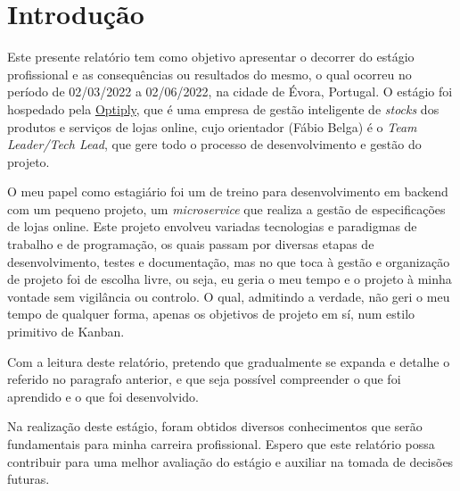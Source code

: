 \chapter{Introdução}\label{intro}

Este presente relatório tem como objetivo apresentar o decorrer do estágio profissional e as consequências ou resultados do mesmo, o qual ocorreu no período de 02/03/2022 a 02/06/2022, na cidade de Évora, Portugal. O estágio foi hospedado pela \href{https://optiply.nl/}{Optiply}, que é uma empresa de gestão inteligente de \textit{stocks} dos produtos e serviços de lojas online, cujo orientador (Fábio Belga) é o \textit{Team Leader/Tech Lead}, que gere todo o processo de desenvolvimento e gestão do projeto.

O meu papel como estagiário foi um de treino para desenvolvimento em backend com um pequeno projeto, um \textit{microservice} que realiza a gestão de especificações de lojas online. Este projeto envolveu variadas tecnologias e paradigmas de trabalho e de programação, os quais passam por diversas etapas de desenvolvimento, testes e documentação, mas no que toca à gestão e organização de projeto foi de escolha livre, ou seja, eu geria o meu tempo e o projeto à minha vontade sem vigilância ou controlo. O qual, admitindo a verdade, não geri o meu tempo de qualquer forma, apenas os objetivos de projeto em sí, num estilo primitivo de Kanban.

Com a leitura deste relatório, pretendo que gradualmente se expanda e detalhe o referido no paragrafo anterior, e que seja possível compreender o que foi aprendido e o que foi desenvolvido.

Na realização deste estágio, foram obtidos diversos conhecimentos que serão fundamentais para minha carreira profissional. Espero que este relatório possa contribuir para uma melhor avaliação do estágio e auxiliar na tomada de decisões futuras.
